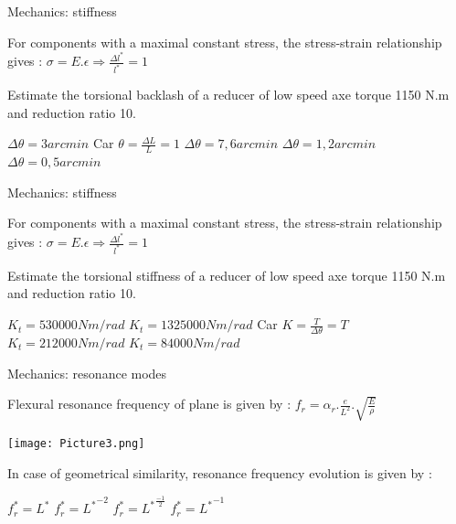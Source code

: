 \documentclass{webquiz}
\begin{document}
 \begin{question}
      \begin{center}
	\large{Mechanics: stiffness}
\end{center}
	For components with a maximal constant stress, the stress-strain relationship gives : $\sigma = E.\epsilon \Rightarrow   \frac{\Delta l^*}{l^*} = 1$
	
	
	Estimate the torsional backlash of a reducer of low speed axe torque 1150 N.m and reduction ratio 10.

     \begin{choice}
      \correct $\Delta \theta = 3 arcmin$
      \feedback Car $\theta = \frac{\Delta L}{L} = 1$
      \incorrect  $\Delta \theta = 7,6 arcmin$
           \incorrect $\Delta \theta = 1,2 arcmin$
         \incorrect $\Delta \theta = 0,5 arcmin$
     \end{choice} 
   \end{question}
   
   
 \begin{question}
     \begin{center}
	\large{Mechanics: stiffness}
\end{center}

	For components with a maximal constant stress, the stress-strain relationship gives : $\sigma = E.\epsilon \Rightarrow   \frac{\Delta l^*}{l^*} = 1$
	
	
	Estimate the torsional stiffness of a reducer of low speed axe torque 1150 N.m and reduction ratio 10.
     \begin{choice}
      \incorrect $K_t = 530 000 Nm/rad$    
      \correct  $K_t = 1 325 000 Nm/rad$
      \feedback Car $K = \frac{T}{\Delta \theta} = T$
           \incorrect $K_t = 212 000 Nm/rad$
         \incorrect $K_t = 84 000 Nm/rad$
     \end{choice} 
   \end{question}
   
   \begin{question}
    \begin{center}
	\large{Mechanics: resonance modes }
\end{center}

	 Flexural resonance frequency  of plane is given by : $f_r = \alpha_r.\frac{e}{L^2}.\sqrt{\frac{E}{\rho}} $
	 \begin{center}
	\texttt{[image: Picture3.png]}
\end{center}
	In case of geometrical similarity, resonance frequency evolution is given by :


     \begin{choice}
      \incorrect $f_r^* = L^*$    
      \incorrect $f_r^* = {L^*}^{-2}$  
     \incorrect $f_r^* =  {L^*}^{\frac{-1}{2}}$  
      \correct $f_r^* = {L^*}^{-1}$  
     \end{choice} 
     
     
   \end{question}
       
\end{document}
